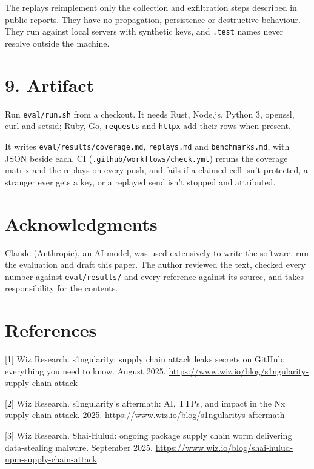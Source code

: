 \documentclass[
  11pt]{article}
\begin{document}
The replays reimplement only the
collection and exfiltration steps
described in public reports. They have
no propagation, persistence or
destructive behaviour. They run against
local servers with synthetic keys, and
\texttt{.test} names never resolve
outside the machine.

\section*{9. Artifact}\label{artifact}

Run \texttt{eval/run.sh} from a
checkout. It needs Rust, Node.js, Python
3, openssl, curl and setsid; Ruby, Go,
\texttt{requests} and \texttt{httpx} add
their rows when present.

It writes
\texttt{eval/results/coverage.md},
\texttt{replays.md} and
\texttt{benchmarks.md}, with JSON beside
each. CI
(\texttt{.github/workflows/check.yml})
reruns the coverage matrix and the
replays on every push, and fails if a
claimed cell isn't protected, a stranger
ever gets a key, or a replayed send
isn't stopped and attributed.

\section*{Acknowledgments}\label{acknowledgments}

Claude (Anthropic), an AI model, was
used extensively to write the software,
run the evaluation and draft this paper.
The author reviewed the text, checked
every number against
\texttt{eval/results/} and every
reference against its source, and takes
responsibility for the contents.

\section*{References}\label{references}

{[}1{]} Wiz Research. s1ngularity:
supply chain attack leaks secrets on
GitHub: everything you need to know.
August 2025.
\url{https://www.wiz.io/blog/s1ngularity-supply-chain-attack}

{[}2{]} Wiz Research. s1ngularity's
aftermath: AI, TTPs, and impact in the
Nx supply chain attack. 2025.
\url{https://www.wiz.io/blog/s1ngularitys-aftermath}

{[}3{]} Wiz Research. Shai-Hulud:
ongoing package supply chain worm
delivering data-stealing malware.
September 2025.
\url{https://www.wiz.io/blog/shai-hulud-npm-supply-chain-attack}
\end{document}
